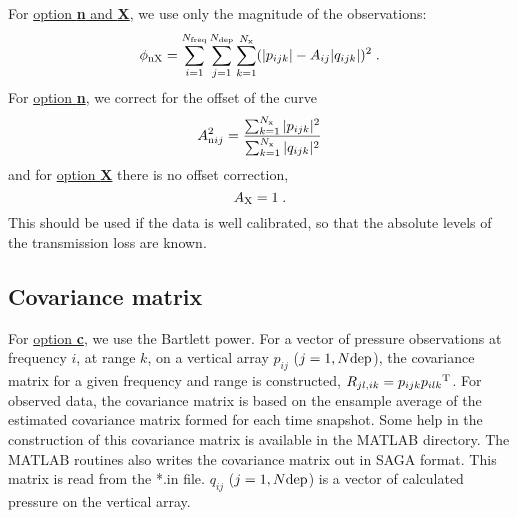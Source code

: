 \documentclass{saclantc}
\begin{document}
For  \underline{option {\bf n} and {\bf X}}, we use only  the magnitude of the
observations:
\begin{equation}
\phi_{\rm nX}=  \sum^{N _{\rm freq}}_{i=1} 
          \sum^{N_{\rm dep}}_{j=1} \sum^{N_{\rm x}}_{k=1}
             (|p_{ijk}|- A_{ij}|q_{ijk}|)^2\;.
\label{eq:obj2}
\end{equation}
For  \underline{option {\bf n}}, we correct for the offset of the curve
\begin{equation}
A^2_{{\rm n}{ij}} = \frac{\sum^{N_{\rm x}}_{k=1} |p_{ijk}|^2}
       { \sum^{N _{\rm x}}_{k=1}|q_{ijk}|^2} 
\label{eq:objn}
\end{equation}
and for \underline{ option {\bf X}} there is no offset correction,
\begin{equation}
A_{\rm X}= 1 \; .
\label{eq:objX}
\end{equation}
This should be used if the data is well calibrated, so that the
absolute levels of the transmission loss are known.

\subsection{Covariance matrix}

For  \underline{option {\bf c}}, we use the Bartlett power. 
For a vector of pressure
observations at frequency $i$, at range $k$, on a vertical array $p_{ij}$ ($j=1, N{\rm dep}$),
the covariance matrix for a given frequency and range is constructed,
${R_{jl,ik}}={ {p}_{ijk}}{ {p}_{ilk}}^{\rm T}$.  
%
For observed data, the covariance matrix is based on the ensample average
of the estimated  covariance matrix formed for each time snapshot.
Some help in the construction of this covariance matrix 
is available in the MATLAB
directory. The MATLAB routines also writes the covariance matrix out
in {\sf SAGA} format.
This matrix is read from the *.in file.
$q_{ij}$ ($j=1, N{\rm dep}$) is a vector of calculated pressure on
the vertical array.

\end{document}
